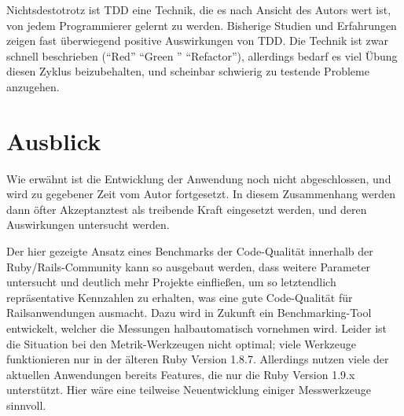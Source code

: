 Nichtsdestotrotz ist TDD eine Technik, die es nach Ansicht des Autors wert ist, von jedem Programmierer gelernt zu werden. Bisherige Studien und Erfahrungen zeigen fast überwiegend positive Auswirkungen von TDD. Die Technik ist zwar schnell beschrieben ("`Red"' "`Green "' "`Refactor"'), allerdings bedarf es viel Übung diesen Zyklus beizubehalten, und scheinbar schwierig zu testende Probleme anzugehen.

%   
%   
%     


\section{Ausblick}
Wie erwähnt ist die Entwicklung der Anwendung noch nicht abgeschlossen, und wird zu gegebener Zeit vom Autor fortgesetzt. In diesem Zusammenhang werden dann öfter Akzeptanztest als treibende Kraft eingesetzt werden, und deren Auswirkungen untersucht werden.

Der hier gezeigte Ansatz eines Benchmarks der Code-Qualität innerhalb der Ruby/Rails\hyp{}Community kann so ausgebaut werden, dass weitere Parameter untersucht und deutlich mehr Projekte einfließen, um so letztendlich repräsentative Kennzahlen zu erhalten, was eine gute Code-Qualität für Railsanwendungen ausmacht. Dazu wird in Zukunft ein Benchmarking-Tool entwickelt, welcher die Messungen halbautomatisch vornehmen wird. Leider ist die Situation bei den Metrik-Werkzeugen nicht optimal; viele Werkzeuge funktionieren nur in der älteren Ruby Version 1.8.7. Allerdings nutzen viele der aktuellen Anwendungen bereits Features, die nur die Ruby Version 1.9.x unterstützt. Hier wäre eine teilweise Neuentwicklung einiger Messwerkzeuge sinnvoll.

